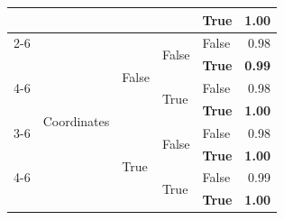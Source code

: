 \begin{tabular}{@{}lllllr@{}}
                                                        &                                   &                           &                           & \textbf{True}         & \textbf{1.00} \\
    \cmidrule{2-6}                                                                                                                                                             
                                                        & \multirow[c]{9}{*}{Coordinates}   & \multirow[c]{4}{*}{False} & \multirow[c]{2}{*}{False} & False                 & 0.98 \\
                                                        &                                   &                           &                           & \textbf{True}         & \textbf{0.99} \\
    \cmidrule{4-6}                                                                                                                                                             
                                                        &                                   &                           & \multirow[c]{2}{*}{True}  & False                 & 0.98 \\
                                                        &                                   &                           &                           & \textbf{True}         & \textbf{1.00} \\
    \cmidrule{3-6}                                                                                                                                                             
                                                        &                                   & \multirow[c]{4}{*}{True}  & \multirow[c]{2}{*}{False} & False                 & 0.98 \\
                                                        &                                   &                           &                           & \textbf{True}         & \textbf{1.00} \\
    \cmidrule{4-6}                                                                                                                                                             
                                                        &                                   &                           & \multirow[c]{2}{*}{True}  & False                 & 0.99 \\
                                                        &                                   &                           &                           & \textbf{True}         & \textbf{1.00} \\

\end{tabular}
